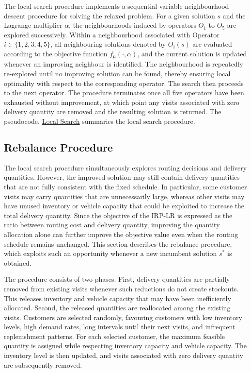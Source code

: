 \documentclass{article}
\begin{document}
The local search procedure implements a sequential variable neighbourhood descent procedure for solving the relaxed problem. For a given solution $s$ and the Lagrange multiplier $\alpha$, the neighbourhoods induced by operators $O_1$ to $O_5$ are explored successively. Within a neighbourhood associated with Operator $i\in \{1,2,3,4,5\}$, all neighbouring solutions denoted by $O_i(s)$ are evaluated according to the objective function $f_{\mu}(\cdot,\alpha)$, and the current solution is updated whenever an improving neighbour is identified. The neighbourhood is repeatedly re-explored until no improving solution can be found, thereby ensuring local optimality with respect to the corresponding operator. The search then proceeds to the next operator. The procedure terminates once all five operators have been exhausted without improvement, at which point any visits associated with zero delivery quantity are removed and the resulting solution is returned. The pseudocode, \hyperref[alg:LocalSearch]{Local Search} summaries the local search procedure.



\subsection{Rebalance Procedure} \label{sec:rebalance}

The local search procedure simultaneously explores routing decisions and delivery quantities. However, the improved solution may still contain delivery quantities that are not fully consistent with the fixed schedule. In particular, some customer visits may carry quantities that are unnecessarily large, whereas other visits may have unused inventory or vehicle capacity that could be exploited to increase the total delivery quantity. Since the objective of the IRP-LR is expressed as the ratio between routing cost and delivery quantity, improving the quantity allocation alone can further improve the objective value even when the routing schedule remains unchanged. This section describes the rebalance procedure, which exploits such an opportunity whenever a new incumbent solution $s^*$ is obtained. 

The procedure consists of two phases. First, delivery quantities are partially removed from existing visits whenever such reductions do not create stockouts. This releases inventory and vehicle capacity that may have been inefficiently allocated. Second, the released quantities are reallocated among the existing visits. Customers are selected randomly, favouring customers with low inventory levels, high demand rates, long intervals until their next visits, and infrequent replenishment patterns. For each selected customer, the maximum feasible quantity is assigned while respecting inventory capacity and vehicle capacity. The inventory level is then updated, and visits associated with zero delivery quantity are subsequently removed.
\end{document}
